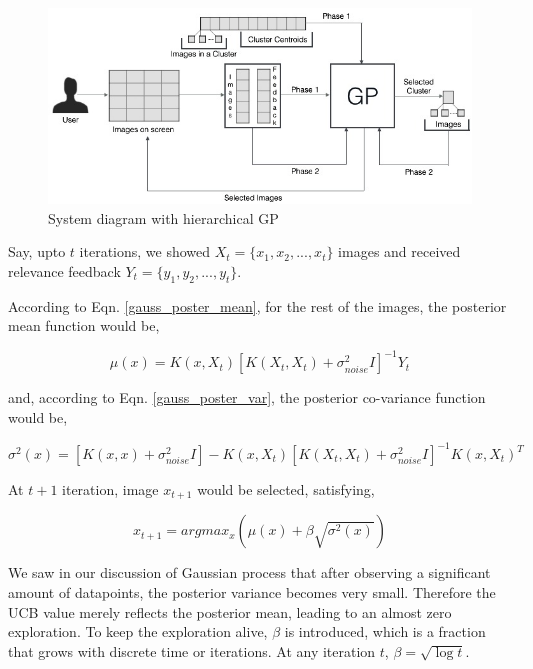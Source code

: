 \documentclass[english]{tktltiki}
\begin{document}
\begin{figure}[h!]
  \centering
    \includegraphics[width=1.0\textwidth]{figures/Imse_System_Diagram}
    \caption{System diagram with hierarchical GP}
    \label{system_diagram_1}
\end{figure}

Say, upto $t$ iterations, we showed $X_t = \{x_1, x_2, ..., x_t\}$ images and received relevance feedback $Y_t = \{y_1, y_2, ..., y_t\}$.

According to Eqn. \ref{gauss_poster_mean}, for the rest of the images, the posterior mean function would be,

\begin{equation}
\mu(x) = K(x, X_t)[K(X_t, X_t) + \sigma_{noise}^2I]^{-1}Y_t
\end{equation}

and, according to Eqn. \ref{gauss_poster_var}, the posterior co-variance function would be,

\begin{equation}
\sigma^2(x) = [K(x, x) + \sigma_{noise}^2I] - K(x, X_t)[K(X_t, X_t) + \sigma_{noise}^2I]^{-1}K(x, X_t)^T
\end{equation}

At $t+1$ iteration, image $x_{t+1}$ would be selected, satisfying,

\begin{equation}
x_{t+1} = argmax_x(\mu(x) + \beta\sqrt{\sigma^2(x)})
\end{equation}

We saw in our discussion of Gaussian process that after observing a significant amount of datapoints, the posterior variance becomes very small. Therefore the UCB value merely reflects the posterior mean, leading to an almost zero exploration. To keep the exploration alive, $\beta$ is introduced, which is a fraction that grows with discrete time or iterations. At any iteration $t$, $\beta = \sqrt{\log t}$.
\end{document}
